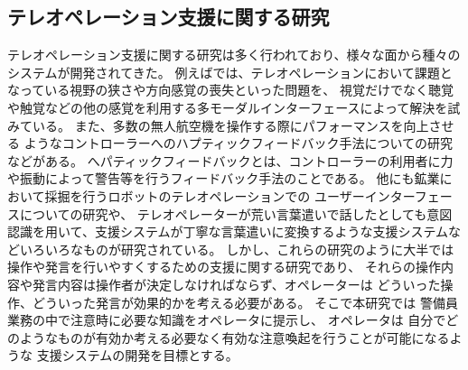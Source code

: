 \documentclass{kuisthesis}
\begin{document}
\subsection{テレオペレーション支援に関する研究}
テレオペレーション支援に関する研究は多く行われており、様々な面から種々のシステムが開発されてきた。
例えば\cite{chen2007human,triantafyllidis2020study}では、テレオペレーションにおいて課題となっている視野の狭さや方向感覚の喪失といった問題を、
視覚だけでなく聴覚や触覚などの他の感覚を利用する多モーダルインターフェースによって解決を試みている。
また、多数の無人航空機を操作する際にパフォーマンスを向上させる
ようなコントローラーへのハプティックフィードバック手法についての研究\cite{son2011measuring}などがある。
へパティックフィードバックとは、コントローラーの利用者に力や振動によって警告等を行うフィードバック手法のことである。
他にも鉱業において採掘を行うロボットのテレオペレーションでの
ユーザーインターフェースについての研究\cite{hainsworth2001teleoperation}や、
テレオペレーターが荒い言葉遣いで話したとしても意図認識を用いて、支援システムが丁寧な言葉遣いに変換するような支援システム\cite{Daneshmand2023}などいろいろなものが研究されている。
しかし、これらの研究のように大半では操作や発言を行いやすくするための支援に関する研究であり、
それらの操作内容や発言内容は操作者が決定しなければならず、オペレーターは
どういった操作、どういった発言が効果的かを考える必要がある。
そこで本研究では
警備員業務の中で注意時に必要な知識をオペレータに提示し、
オペレータは
自分でどのようなものが有効か考える必要なく有効な注意喚起を行うことが可能になるような
支援システムの開発を目標とする。
\end{document}
